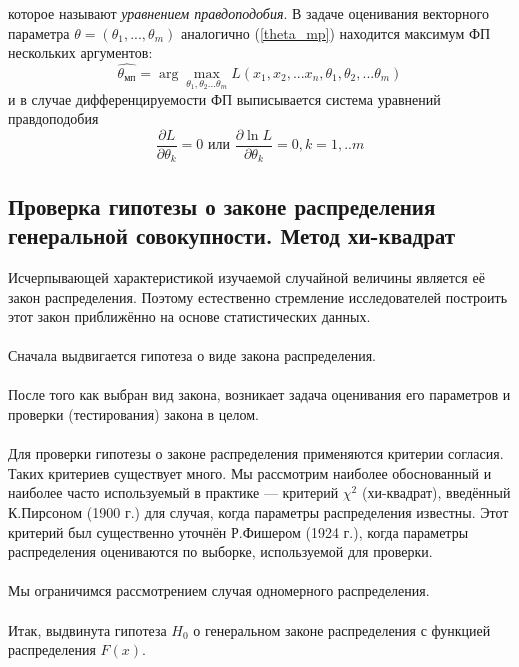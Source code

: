 \documentclass[a4paper,14pt]{article}
\begin{document}
	которое называют \textit{уравнением правдоподобия}.
	В задаче оценивания векторного параметра $\theta = (\theta_{1}, ... ,\theta_{m})$ аналогично (\ref{theta_mp}) находится максимум ФП нескольких аргументов: 
	\begin{equation}
		\hat{\theta_{мп}} = \arg \max_{\theta_{1}, \theta_{2}...\theta_{m}} L(x_{1}, x_{2},...x_{n}, \theta_{1}, \theta_{2},...\theta_{m})
		\label{multi_theta}
	\end{equation}
	и в случае дифференцируемости ФП выписывается система уравнений правдоподобия
	\begin{equation}
		\frac{\partial L}{\partial \theta_{k}} = 0 \text{  или  } \frac{\partial \ln L}{\partial \theta_{k}} = 0, k = 1,..m
	\end{equation}
	
	\subsection{Проверка гипотезы о законе распределения генеральной совокупности. Метод хи-квадрат}
	\noindent Исчерпывающей характеристикой изучаемой случайной величины является её закон распределения. Поэтому естественно стремление исследователей построить этот закон приближённо на основе статистических данных.
	\\\\
	Сначала выдвигается гипотеза о виде закона распределения.
	\\\\
	После того как выбран вид закона, возникает задача оценивания его параметров и проверки (тестирования) закона в целом.
	\\\\
	Для проверки гипотезы о законе распределения применяются критерии согласия. Таких критериев существует много. Мы рассмотрим наиболее обоснованный и наиболее часто используемый в практике — критерий $\chi^{2}$ (хи-квадрат), введённый К.Пирсоном (1900 г.) для случая, когда параметры распределения известны. Этот критерий был существенно уточнён Р.Фишером (1924 г.), когда параметры распределения оцениваются по выборке, используемой для проверки.
	\\\\
	Мы ограничимся рассмотрением случая одномерного распределения.
	\\\\
	Итак, выдвинута гипотеза $H_{0}$ о генеральном законе распределения с функцией распределения $F(x)$.
	\\\\
\end{document}
